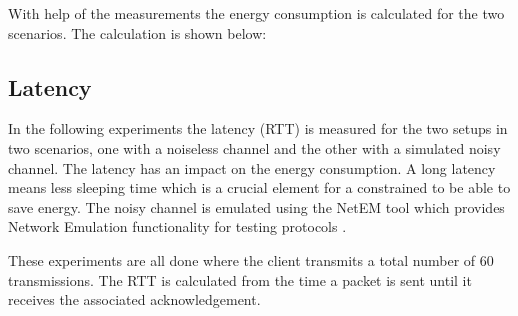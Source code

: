 With help of the measurements the energy consumption is calculated for the two scenarios. The calculation is shown below:

\subsection{Latency}
In the following experiments the latency (RTT) is measured for the two setups in two scenarios, one with a noiseless channel and the other with a simulated noisy channel. The latency has an impact on the energy consumption. A long latency means less sleeping time which is a crucial element for a constrained to be able to save energy.
The noisy channel is emulated using the NetEM tool which provides Network Emulation functionality for testing protocols \cite{netem19:online}. 

These experiments are all done where the client transmits a total number of 60 transmissions. The RTT is calculated from the time a packet is sent until it receives the associated acknowledgement.


